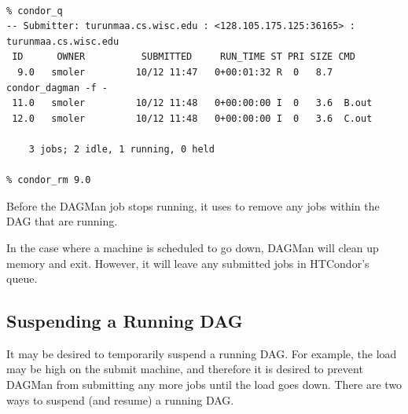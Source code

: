 \footnotesize
\begin{verbatim}

% condor_q
-- Submitter: turunmaa.cs.wisc.edu : <128.105.175.125:36165> : turunmaa.cs.wisc.edu
 ID      OWNER          SUBMITTED     RUN_TIME ST PRI SIZE CMD
  9.0   smoler         10/12 11:47   0+00:01:32 R  0   8.7  condor_dagman -f -
 11.0   smoler         10/12 11:48   0+00:00:00 I  0   3.6  B.out
 12.0   smoler         10/12 11:48   0+00:00:00 I  0   3.6  C.out

    3 jobs; 2 idle, 1 running, 0 held

% condor_rm 9.0
\end{verbatim}
\normalsize

Before the DAGMan job stops running, it uses 
to remove any jobs within the DAG that are running.

In the case where a
machine is scheduled to go down,
DAGMan will clean up memory and exit.
However, it will leave any submitted jobs
in HTCondor's queue.

\subsection{\label{sec:DagSuspend}Suspending a Running DAG}

It may be desired to temporarily suspend a running DAG.
For example, the load may be high on the submit machine,
and therefore it is desired to prevent DAGMan from
submitting any more jobs until the load goes down.
There are two ways to suspend (and resume) a running DAG.

